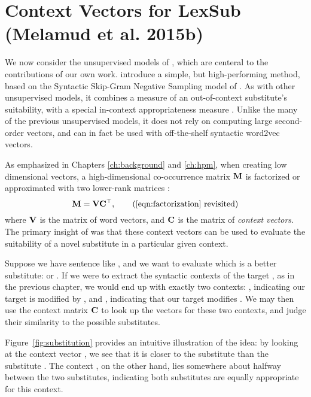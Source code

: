 \section{Context Vectors for LexSub (Melamud et al. 2015b)}
\label{sec:melamud}

We now consider the unsupervised models of , which
are centeral to the contributions of our own work.
 introduce a simple, but high-performing method,
based on the Syntactic Skip-Gram Negative Sampling model of
. As with other unsupervised models, it combines a
measure of an out-of-context substitute's suitability, with a special
in-context appropriateness measure \cite{erk:2008:emnlp}. Unlike the many of
the previous unsupervised models, it does not rely on computing large
second-order vectors, and can in fact be used with off-the-shelf syntactic
word2vec vectors.

As emphasized in Chapters \ref{ch:background} and \ref{ch:hpm}, when creating
low dimensional vectors, a high-dimensional co-occurrence matrix ${{\mathbf{M}}}$ is
factorized or approximated with two lower-rank matrices \cite{levy:2014:nips}:
\begin{equation*}
  \mM = \mV\mC\trans,
  \tag{\ref{eqn:factorization} revisited}
\end{equation*}
where ${{\mathbf{V}}}$ is the matrix of word vectors, and ${{\mathbf{C}}}$ is the matrix of
{\em context vectors}. The primary insight of 
was that these context vectors can be used to evaluate the suitability of a
novel substitute in a particular given context.

Suppose we have sentence like , and we
want to evaluate which is a better substitute:  or .
If we were to extract the syntactic contexts of the target , as in
the previous chapter, we would end up with exactly two contexts:
, indicating our target is modified by , and
, indicating that our target modifies
. We may then use the context matrix ${{\mathbf{C}}}$ to look up the
vectors for these two contexts, and judge their similarity to the possible
substitutes.

Figure~\ref{fig:substitution} provides an intuitive illustration of the idea:
by looking at the context vector , we see that it is
closer to the substitute  than the substitute . The
context , on the other hand, lies somewhere about halfway
between the two substitutes, indicating both substitutes are equally appropriate
for this context.

